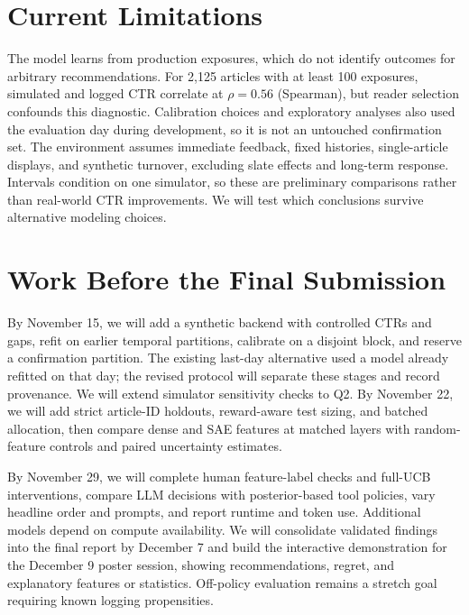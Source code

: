 \documentclass{article}
\begin{document}
\balance
\section{Current Limitations}
The model learns from production exposures, which do not identify outcomes for arbitrary recommendations. For 2,125 articles with at least 100 exposures, simulated and logged CTR correlate at $\rho=0.56$ (Spearman), but reader selection confounds this diagnostic. Calibration choices and exploratory analyses also used the evaluation day during development, so it is not an untouched confirmation set. The environment assumes immediate feedback, fixed histories, single-article displays, and synthetic turnover, excluding slate effects and long-term response. Intervals condition on one simulator, so these are preliminary comparisons rather than real-world CTR improvements. We will test which conclusions survive alternative modeling choices.

\section*{Work Before the Final Submission}
By November 15, we will add a synthetic backend with controlled CTRs and gaps, refit on earlier temporal partitions, calibrate on a disjoint block, and reserve a confirmation partition. The existing last-day alternative used a model already refitted on that day; the revised protocol will separate these stages and record provenance. We will extend simulator sensitivity checks to Q2. By November 22, we will add strict article-ID holdouts, reward-aware test sizing, and batched allocation, then compare dense and SAE features at matched layers with random-feature controls and paired uncertainty estimates.

By November 29, we will complete human feature-label checks and full-UCB interventions, compare LLM decisions with posterior-based tool policies, vary headline order and prompts, and report runtime and token use. Additional models depend on compute availability. We will consolidate validated findings into the final report by December 7 and build the interactive demonstration for the December 9 poster session, showing recommendations, regret, and explanatory features or statistics. Off-policy evaluation remains a stretch goal requiring known logging propensities.



\end{document}
